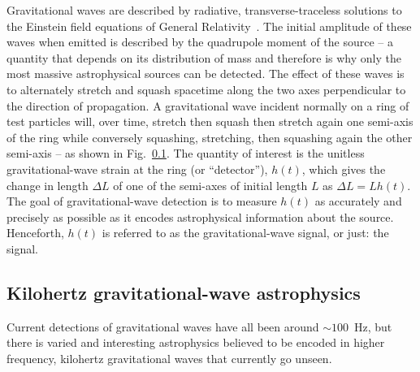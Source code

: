 Gravitational waves are described by radiative, transverse-traceless solutions to the Einstein field equations of General Relativity~\cite{}. %
The initial amplitude of these waves when emitted is described by the quadrupole moment of the source -- a quantity that depends on its distribution of mass and therefore is why only the most massive astrophysical sources can be detected. %
The effect of these waves is to alternately stretch and squash spacetime along the two axes perpendicular to the direction of propagation. A gravitational wave incident normally on a ring of test particles will, over time, stretch then squash then stretch again one semi-axis of the ring while conversely squashing, stretching, then squashing again the other semi-axis -- as shown in Fig.~\ref{}.
The quantity of interest is the unitless gravitational-wave strain at the ring (or ``detector''), $h(t)$, which gives the change in length $\Delta L$ of one of the semi-axes of initial length $L$ as $\Delta L = L h(t)$. The goal of gravitational-wave detection is to measure $h(t)$ as accurately and precisely as possible as it encodes astrophysical information about the source. Henceforth, $h(t)$ is referred to as the gravitational-wave signal, or just: the signal.



\subsection{Kilohertz gravitational-wave astrophysics} %

Current detections of gravitational waves have all been around $\sim100$~Hz, but there is varied and interesting astrophysics believed to be encoded in higher frequency, kilohertz gravitational waves that currently go unseen.




